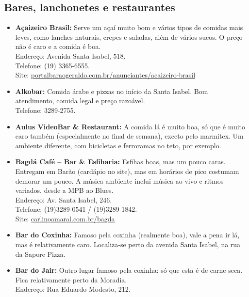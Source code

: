 \subsection{Bares, lanchonetes e restaurantes}
\begin{itemize}
\item   \textbf{Açaizeiro Brasil:} Serve um açaí muito bom e vários tipos de
        comidas mais leves, como lanches naturais, crepes e saladas, além de
        vários sucos. O preço não é caro e a comida é boa.
        \\Endereço: Avenida Santa Isabel, 518.
        \\Telefone: (19) 3365-6555.
        \\Site: \url{portalbaraogeraldo.com.br/anunciantes/acaizeiro-brasil}

\item   \textbf{Alkobar:} Comida árabe e pizzas no início da Santa Isabel. Bom
        atendimento, comida legal e preço razoável.
        \\Telefone: 3289-2755.

\item   \textbf{Aulus VideoBar \& Restaurant:} A comida lá é muito boa, só que é
        muito caro também (especialmente no final de semana), exceto pelo
        marmitex. Um ambiente diferente, com bicicletas e ferroramas no teto,
        por exemplo.

\item   \textbf{Bagdá Café -- Bar \& Esfiharia:} Esfihas boas, mas um pouco
        caras. Entregam em Barão (cardápio no site), mas em horários de pico
        costumam demorar um pouco. A música ambiente inclui música ao vivo e
        ritmos variados, desde a MPB ao Blues.
        \\Endereço: Av. Santa Isabel, 246.
        \\Telefone: (19)3289-0541 / (19)3289-1842.
        \\Site: \url{carlinoamaral.com.br/bagda}

\item   \textbf{Bar do Coxinha:} Famoso pela coxinha (realmente boa), vale a
        pena ir lá, mas é relativamente caro. Localiza-se perto da avenida Santa
        Isabel, na rua da Sapore Pizza.

\item   \textbf{Bar do Jair:} Outro lugar famoso pela coxinha: só que esta é de
        carne seca. Fica relativamente perto da Moradia.
        \\Endereço: Rua Eduardo Modesto, 212.


\end{itemize}
